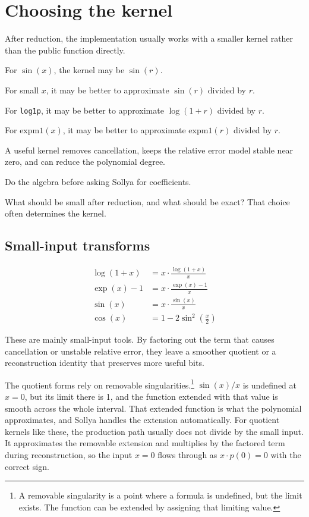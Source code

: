 \documentclass[manuscript, nonacm]{acmart}
\begin{document}
    \section{Choosing the kernel}
    \label{sec:kernel}

    After reduction, the implementation usually works with a smaller kernel rather
    than the public function directly.


    For $\sin(x)$, the kernel may be $\sin(r)$.

    For small $x$, it may be better to approximate $\sin(r)$ divided by $r$.

    For \texttt{log1p}, it may be better to approximate $\log(1+r)$
    divided by $r$.

    For $\mathrm{expm1}(x)$, it may be better to approximate
    $\mathrm{expm1}(r)$ divided by $r$.

    A useful kernel removes cancellation, keeps the relative error model stable near
    zero, and can reduce the polynomial degree.

    Do the algebra before asking Sollya for coefficients.

    What should be small after reduction, and what should be exact? That choice
    often determines the kernel.

    \subsection{Small-input transforms}
    \begin{align*}
        \log(1+x) &= x \cdot \frac{\log(1+x)}{x} \\[4pt]
        \exp(x)-1  &= x \cdot \frac{\exp(x)-1}{x} \\[4pt]
        \sin(x)    &= x \cdot \frac{\sin(x)}{x} \\[4pt]
        \cos(x)    &= 1 - 2\sin^2\!\left(\tfrac{x}{2}\right)
    \end{align*}

    These are mainly small-input tools. By factoring out the term that causes
    cancellation or unstable relative error, they leave a smoother quotient or a
    reconstruction identity that preserves more useful bits.

    The quotient forms rely on removable singularities.\footnote{A removable singularity is a point where a formula is undefined, but the limit exists. The function can be extended by assigning that limiting value.}  $\sin(x)/x$ is undefined
    at $x = 0$, but its limit there is 1, and the function extended with that value
    is smooth across the whole interval. That extended function is what the
    polynomial approximates, and Sollya handles the extension automatically. For
    quotient kernels like these, the production path usually does not divide by
    the small input. It approximates the removable extension and multiplies by
    the factored term during reconstruction, so the input $x = 0$ flows through
    as $x \cdot p(0) = 0$ with the correct sign.
\end{document}
